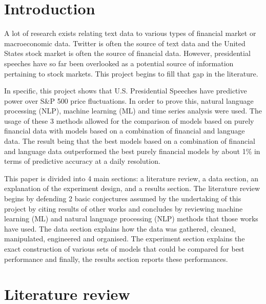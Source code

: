 \documentclass[11pt,preprint, authoryear]{elsarticle}
\numberwithin{equation}{section}
\numberwithin{figure}{section}
\numberwithin{table}{section}
\begin{document}
\headsep 35pt %




\newpage

\hypertarget{introduction}{%
\section{\texorpdfstring{Introduction
\label{Introduction}}{Introduction }}\label{introduction}}

A lot of research exists relating text data to various types of
financial market or macroeconomic data. Twitter is often the source of
text data and the United States stock market is often the source of
financial data. However, presidential speeches have so far been
overlooked as a potential source of information pertaining to stock
markets. This project begins to fill that gap in the literature.

In specific, this project shows that U.S. Presidential Speeches have
predictive power over S\&P 500 price fluctuations. In order to prove
this, natural language processing (NLP), machine learning (ML) and time
series analysis were used. The usage of these 3 methods allowed for the
comparison of models based on purely financial data with models based on
a combination of financial and language data. The result being that the
best models based on a combination of financial and language data
outperformed the best purely financial models by about 1\% in terms of
predictive accuracy at a daily resolution.

This paper is divided into 4 main sections: a literature review, a data
section, an explanation of the experiment design, and a results section.
The literature review begins by defending 2 basic conjectures assumed by
the undertaking of this project by citing results of other works and
concludes by reviewing machine learning (ML) and natural language
processing (NLP) methods that those works have used. The data section
explains how the data was gathered, cleaned, manipulated, engineered and
organised. The experiment section explains the exact construction of
various sets of models that could be compared for best performance and
finally, the results section reports these performances.

\hypertarget{literature-review}{%
\section{\texorpdfstring{Literature review
\label{Literature review}}{Literature review }}\label{literature-review}}
\end{document}
